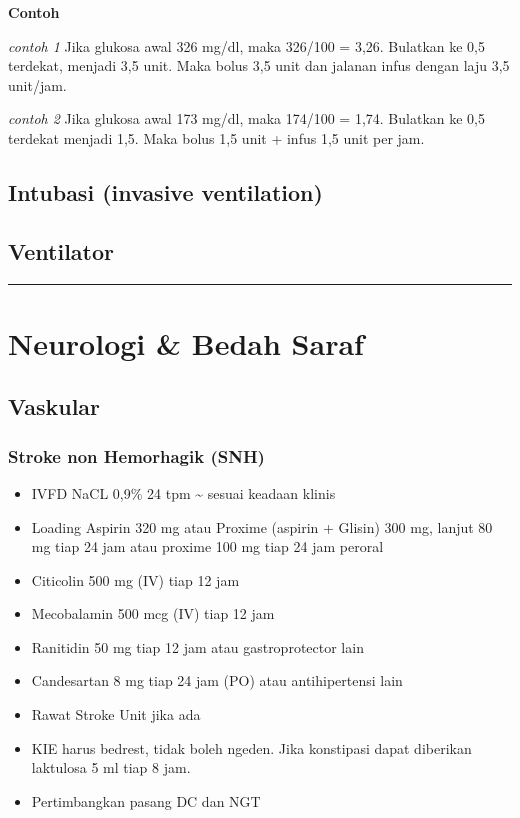 \documentclass[
]{book}
\providecommand{\tightlist}{%
  \setlength{\itemsep}{0pt}\setlength{\parskip}{0pt}}
\begin{document}
\textbf{Contoh}

\emph{contoh 1}
Jika glukosa awal 326 mg/dl, maka 326/100 = 3,26. Bulatkan ke 0,5 terdekat, menjadi 3,5 unit. Maka bolus 3,5 unit dan jalanan infus dengan laju 3,5 unit/jam.

\emph{contoh 2}
Jika glukosa awal 173 mg/dl, maka 174/100 = 1,74. Bulatkan ke 0,5 terdekat menjadi 1,5. Maka bolus 1,5 unit + infus 1,5 unit per jam.

\hypertarget{intubasi-invasive-ventilation}{%
\subsection{Intubasi (invasive ventilation)}\label{intubasi-invasive-ventilation}}

\hypertarget{ventilator}{%
\subsection{Ventilator}\label{ventilator}}

\begin{center}\rule{0.5\linewidth}{0.5pt}\end{center}

\hypertarget{neurologi-bedah-saraf-1}{%
\section{Neurologi \& Bedah Saraf}\label{neurologi-bedah-saraf-1}}

\hypertarget{vaskular}{%
\subsection{Vaskular}\label{vaskular}}

\hypertarget{stroke-non-hemorhagik-snh}{%
\subsubsection{Stroke non Hemorhagik (SNH)}\label{stroke-non-hemorhagik-snh}}

\begin{itemize}
\tightlist
\item
  IVFD NaCL 0,9\% 24 tpm \textasciitilde{} sesuai keadaan klinis
\item
  Loading Aspirin 320 mg atau Proxime (aspirin + Glisin) 300 mg, lanjut 80 mg tiap 24 jam atau proxime 100 mg tiap 24 jam peroral
\item
  Citicolin 500 mg (IV) tiap 12 jam
\item
  Mecobalamin 500 mcg (IV) tiap 12 jam
\item
  Ranitidin 50 mg tiap 12 jam atau gastroprotector lain
\item
  Candesartan 8 mg tiap 24 jam (PO) atau antihipertensi lain
\item
  Rawat Stroke Unit jika ada
\item
  KIE harus bedrest, tidak boleh ngeden. Jika konstipasi dapat diberikan laktulosa 5 ml tiap 8 jam.
\item
  Pertimbangkan pasang DC dan NGT
\end{itemize}
\end{document}
